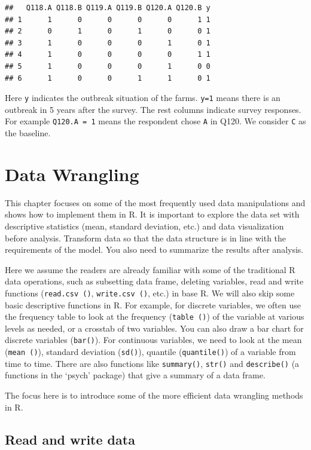\documentclass[]{book}
\theoremstyle{definition}
\theoremstyle{definition}
\theoremstyle{remark}
\begin{document}
\begin{verbatim}
##   Q118.A Q118.B Q119.A Q119.B Q120.A Q120.B y
## 1      1      0      0      0      0      1 1
## 2      0      1      0      1      0      0 1
## 3      1      0      0      0      1      0 1
## 4      1      0      0      0      0      1 1
## 5      1      0      0      0      1      0 0
## 6      1      0      0      1      1      0 1
\end{verbatim}

Here \texttt{y} indicates the outbreak situation of the farms.
\texttt{y=1} means there is an outbreak in 5 years after the survey. The
rest columns indicate survey responses. For example
\texttt{Q120.A\ =\ 1} means the respondent chose \texttt{A} in Q120. We
consider \texttt{C} as the baseline.

\chapter{Data Wrangling}\label{data-wrangling}

This chapter focuses on some of the most frequently used data
manipulations and shows how to implement them in R. It is important to
explore the data set with descriptive statistics (mean, standard
deviation, etc.) and data visualization before analysis. Transform data
so that the data structure is in line with the requirements of the
model. You also need to summarize the results after analysis.

Here we assume the readers are already familiar with some of the
traditional R data operations, such as subsetting data frame, deleting
variables, read and write functions (\texttt{read.csv\ ()},
\texttt{write.csv\ ()}, etc.) in base R. We will also skip some basic
descriptive functions in R. For example, for discrete variables, we
often use the frequency table to look at the frequency
(\texttt{table\ ()}) of the variable at various levels as needed, or a
crosstab of two variables. You can also draw a bar chart for discrete
variables (\texttt{bar()}). For continuous variables, we need to look at
the mean (\texttt{mean\ ()}), standard deviation (\texttt{sd()}),
quantile (\texttt{quantile()}) of a variable from time to time. There
are also functions like \texttt{summary()}, \texttt{str()} and
\texttt{describe()} (a functions in the `psych' package) that give a
summary of a data frame.

The focus here is to introduce some of the more efficient data wrangling
methods in R.

\section{Read and write data}\label{read-and-write-data}
\end{document}
